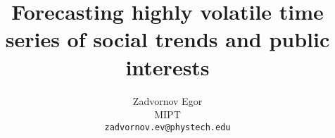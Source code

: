 

\documentclass{article}

\usepackage{arxiv}

\usepackage{multirow}
\usepackage{wrapfig}
\usepackage[T2A]{fontenc}			%
\usepackage[utf8]   {inputenc}			%
\usepackage[english]{babel}	%
\usepackage{hyperref}       %
\usepackage{url}    


\usepackage{amsmath,amsfonts,amssymb,amsthm,mathtools} 

\usepackage{booktabs}       %
\usepackage{amsfonts}       %
\usepackage{nicefrac}       %
\usepackage{microtype}      %
\usepackage{lipsum}
\usepackage{graphicx}
\usepackage{float}

\graphicspath{ {./images/} }



\usepackage{amsmath}
\usepackage{graphicx}
\usepackage{subfigure}

\title{Forecasting highly volatile time series of social trends and public interests}


\author{
  Zadvornov Egor \\
  MIPT\\
  \texttt{zadvornov.ev@phystech.edu} \\
}



